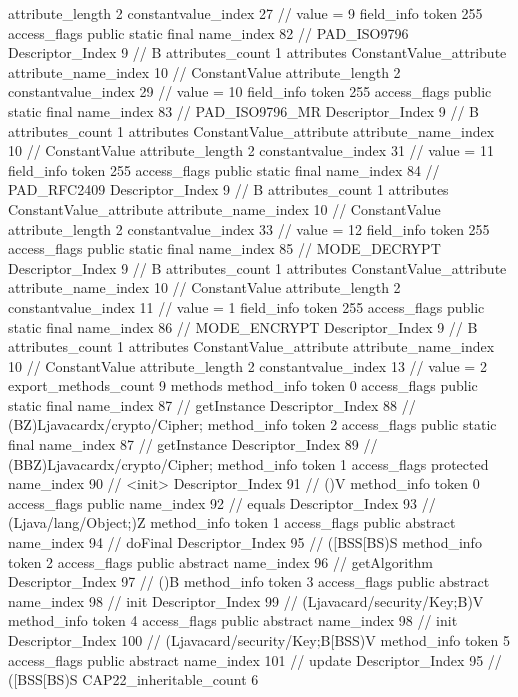 {{{{{{{					attribute_length	2
					constantvalue_index	27		// value = 9
				}
				}
			}
			field_info {
				token	255
				access_flags	public static final
				name_index	82		// PAD_ISO9796
				Descriptor_Index	9		// B
				attributes_count	1
				attributes {
				ConstantValue_attribute {
					attribute_name_index	10		// ConstantValue
					attribute_length	2
					constantvalue_index	29		// value = 10
				}
				}
			}
			field_info {
				token	255
				access_flags	public static final
				name_index	83		// PAD_ISO9796_MR
				Descriptor_Index	9		// B
				attributes_count	1
				attributes {
				ConstantValue_attribute {
					attribute_name_index	10		// ConstantValue
					attribute_length	2
					constantvalue_index	31		// value = 11
				}
				}
			}
			field_info {
				token	255
				access_flags	public static final
				name_index	84		// PAD_RFC2409
				Descriptor_Index	9		// B
				attributes_count	1
				attributes {
				ConstantValue_attribute {
					attribute_name_index	10		// ConstantValue
					attribute_length	2
					constantvalue_index	33		// value = 12
				}
				}
			}
			field_info {
				token	255
				access_flags	public static final
				name_index	85		// MODE_DECRYPT
				Descriptor_Index	9		// B
				attributes_count	1
				attributes {
				ConstantValue_attribute {
					attribute_name_index	10		// ConstantValue
					attribute_length	2
					constantvalue_index	11		// value = 1
				}
				}
			}
			field_info {
				token	255
				access_flags	public static final
				name_index	86		// MODE_ENCRYPT
				Descriptor_Index	9		// B
				attributes_count	1
				attributes {
				ConstantValue_attribute {
					attribute_name_index	10		// ConstantValue
					attribute_length	2
					constantvalue_index	13		// value = 2
				}
				}
			}
			}
			export_methods_count	9
			methods {
				method_info {
					token	0
					access_flags	public static final
					name_index	87		// getInstance
					Descriptor_Index	88		// (BZ)Ljavacardx/crypto/Cipher;
				}
				method_info {
					token	2
					access_flags	public static final
					name_index	87		// getInstance
					Descriptor_Index	89		// (BBZ)Ljavacardx/crypto/Cipher;
				}
				method_info {
					token	1
					access_flags	protected
					name_index	90		// <init>
					Descriptor_Index	91		// ()V
				}
				method_info {
					token	0
					access_flags	public
					name_index	92		// equals
					Descriptor_Index	93		// (Ljava/lang/Object;)Z
				}
				method_info {
					token	1
					access_flags	public abstract
					name_index	94		// doFinal
					Descriptor_Index	95		// ([BSS[BS)S
				}
				method_info {
					token	2
					access_flags	public abstract
					name_index	96		// getAlgorithm
					Descriptor_Index	97		// ()B
				}
				method_info {
					token	3
					access_flags	public abstract
					name_index	98		// init
					Descriptor_Index	99		// (Ljavacard/security/Key;B)V
				}
				method_info {
					token	4
					access_flags	public abstract
					name_index	98		// init
					Descriptor_Index	100		// (Ljavacard/security/Key;B[BSS)V
				}
				method_info {
					token	5
					access_flags	public abstract
					name_index	101		// update
					Descriptor_Index	95		// ([BSS[BS)S
				}
			}
			CAP22_inheritable_count	6
		}
	}
}
